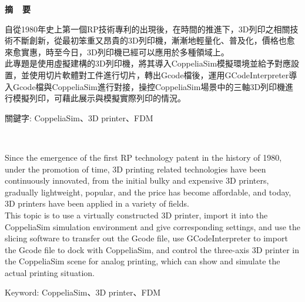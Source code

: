 \renewcommand{\baselinestretch}{1.5} %
\clearpage  %
\sectionef
{} %
\begin{center}
\LARGE\textbf{摘~~要}\\
\end{center}
\begin{flushleft}
\fontsize{14pt}{20pt}\sectionef\hspace{12pt}\quad 自從1980年史上第一個RP技術專利的出現後，在時間的推進下，3D列印之相關技術不斷創新，從最初笨重又昂貴的3D列印機，漸漸地輕量化、普及化，價格也愈來愈實惠，時至今日，3D列印機已經可以應用於多種領域上。\\[12pt]

\fontsize{14pt}{20pt}\sectionef\hspace{12pt}\quad 此專題是使用虛擬建構的3D列印機，將其導入CoppeliaSim模擬環境並給予對應設置，並使用切片軟體對工件進行切片，轉出Gcode檔後，運用GCodeInterpreter導入Gcode檔與CoppeliaSim進行對接，操控CoppeliaSim場景中的三軸3D列印機進行模擬列印，可藉此展示與模擬實際列印的情況。\\[12pt]

\end{flushleft}
\fontsize{14pt}{20pt}\selectfont \sectionef 關鍵字: CoppeliaSim、3D printer、FDM
\newpage
\renewcommand{\baselinestretch}{1.5} %
\begin{center}
\LARGE\textbf{}\\
\end{center}
\begin{flushleft}
\fontsize{14pt}{16pt}\sectionef\hspace{12pt}\quad Since the emergence of the first RP technology patent in the history of 1980, under the promotion of time, 3D printing related technologies have been continuously innovated, from the initial bulky and expensive 3D printers, gradually lightweight, popular, and the price has become affordable, and today, 3D printers have been applied in a variety of fields.\\[12pt]

\fontsize{14pt}{16pt}\sectionef\hspace{12pt}\quad This topic is to use a virtually constructed 3D printer, import it into the CoppeliaSim simulation environment and give corresponding settings, and use the slicing software to transfer out the Gcode file, use GCodeInterpreter to import the Gcode file to dock with CoppeliaSim, and control the three-axis 3D printer in the CoppeliaSim scene for analog printing, which can show and simulate the actual printing situation.\\
\end{flushleft}
\fontsize{14pt}{16pt}\selectfont \sectionef Keyword: CoppeliaSim、3D printer、FDM